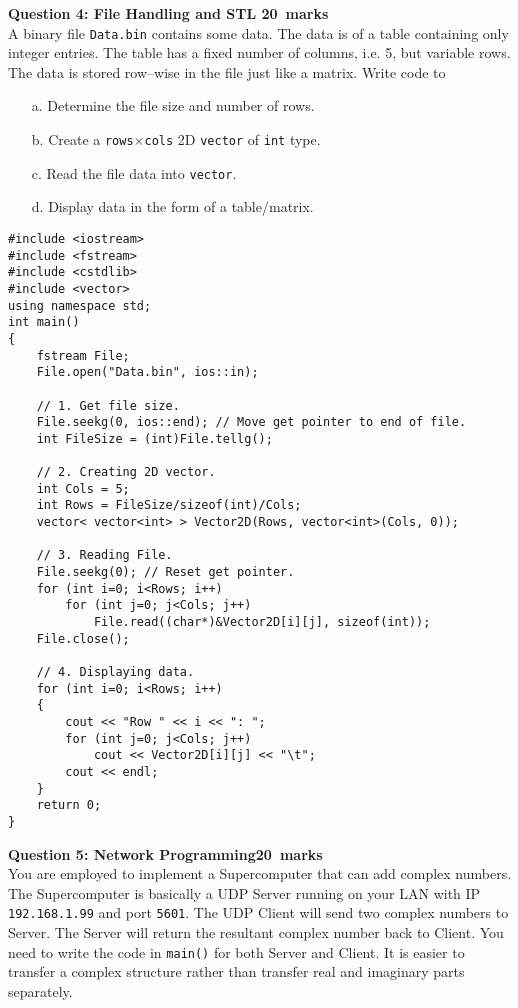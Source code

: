 \documentclass[12pt,a4paper]{article}
\def\Qfour{20}
\def\Qfive{20}
\begin{document}
\newpage
\noindent\textbf{Question 4: File Handling and STL \hfill \Qfour~marks}\\
A binary file \verb|Data.bin| contains some data. The data is of a table containing only integer entries. The table has a fixed number of columns, i.e. 5, but variable rows. The data is stored row--wise in the file just like a matrix. Write code to
\begin{itemize}
\item[a.] Determine the file size and number of rows.
\item[b.] Create a \verb|rows|$\times$\verb|cols| 2D \verb|vector| of \verb|int| type.
\item[c.] Read the file data into \verb|vector|.
\item[d.] Display data in the form of a table/matrix.
\end{itemize}
\begin{lstlisting}
#include <iostream>
#include <fstream>
#include <cstdlib>
#include <vector>
using namespace std;
int main()
{
	fstream File;
	File.open("Data.bin", ios::in);

	// 1. Get file size.
	File.seekg(0, ios::end); // Move get pointer to end of file.
	int FileSize = (int)File.tellg();

	// 2. Creating 2D vector.
	int Cols = 5;
	int Rows = FileSize/sizeof(int)/Cols;
	vector< vector<int> > Vector2D(Rows, vector<int>(Cols, 0));

	// 3. Reading File.
	File.seekg(0); // Reset get pointer.
	for (int i=0; i<Rows; i++)
		for (int j=0; j<Cols; j++)
			File.read((char*)&Vector2D[i][j], sizeof(int));
	File.close();

	// 4. Displaying data.
	for (int i=0; i<Rows; i++)
	{
		cout << "Row " << i << ": ";
		for (int j=0; j<Cols; j++)
			cout << Vector2D[i][j] << "\t";
		cout << endl;
	}
	return 0;
}
\end{lstlisting}
\newpage
\noindent\textbf{Question 5: Network Programming\hfill \Qfive~marks}\\
You are employed to implement a Supercomputer that can add complex numbers. The Supercomputer is basically a UDP Server running on your LAN with IP \verb|192.168.1.99| and port \verb|5601|. The UDP Client will send two complex numbers to Server. The Server will return the resultant complex number back to Client. You need to write the code in \verb|main()| for both Server and Client. It is easier to transfer a complex structure rather than transfer real and imaginary parts separately.\\
\end{document}
